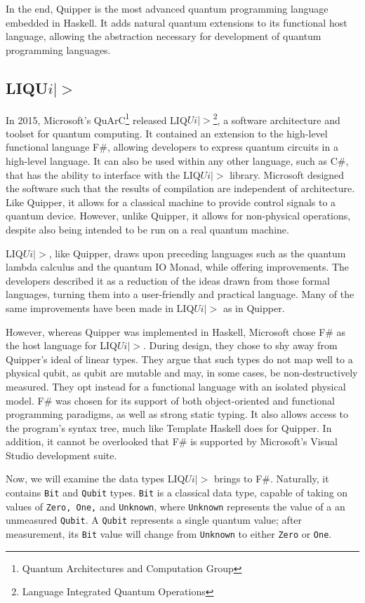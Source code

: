 \documentclass[]{article}
\begin{document}
In the end, Quipper is the most advanced quantum programming language embedded in Haskell. It adds natural quantum extensions to its functional host language, allowing the abstraction necessary for development of quantum programming languages. \cite{quipper1}

\subsection{LIQU$i|>$}
In 2015, Microsoft's QuArC\footnote{Quantum Architectures and Computation Group} released LIQ$Ui|>$\footnote{Language Integrated Quantum Operations}, a software architecture and toolset for quantum computing. It contained an extension to the high-level functional language F\#, allowing developers to express quantum circuits in a high-level language. It can also be used within any other language, such as C\#, that has the ability to interface with the LIQ$Ui|>$ library. Microsoft designed the software such that the results of compilation are independent of architecture. Like Quipper, it allows for a classical machine to provide control signals to a quantum device. However, unlike Quipper, it allows for non-physical operations, despite also being intended to be run on a real quantum machine.

LIQ$Ui|>$, like Quipper, draws upon preceding languages such as the quantum lambda calculus and the quantum IO Monad, while offering improvements. The developers described it as a reduction of the ideas drawn from those formal languages, turning them into a user-friendly and practical language. Many of the same improvements have been made in LIQ$Ui|>$ as in Quipper.

However, whereas Quipper was implemented in Haskell, Microsoft chose F\# as the host language for LIQ$Ui|>$. During design, they chose to shy away from Quipper's ideal of linear types. They argue that such types do not map well to a physical qubit, as qubit are mutable and may, in some cases, be non-destructively measured. They opt instead for a functional language with an isolated physical model. F\# was chosen for its support of both object-oriented and functional programming paradigms, as well as strong static typing. It also allows access to the program's syntax tree, much like Template Haskell does for Quipper. In addition, it cannot be overlooked that F\# is supported by Microsoft's Visual Studio development suite.

Now, we will examine the data types LIQ$Ui|>$ brings to F\#. Naturally, it contains \texttt{Bit} and \texttt{Qubit} types. \texttt{Bit} is a classical data type, capable of taking on values of \texttt{Zero, One,} and \texttt{Unknown}, where \texttt{Unknown} represents the value of a an unmeasured \texttt{Qubit}. A \texttt{Qubit} represents a single quantum value; after measurement, its \texttt{Bit} value will change from \texttt{Unknown} to either \texttt{Zero} or \texttt{One}.
\end{document}
